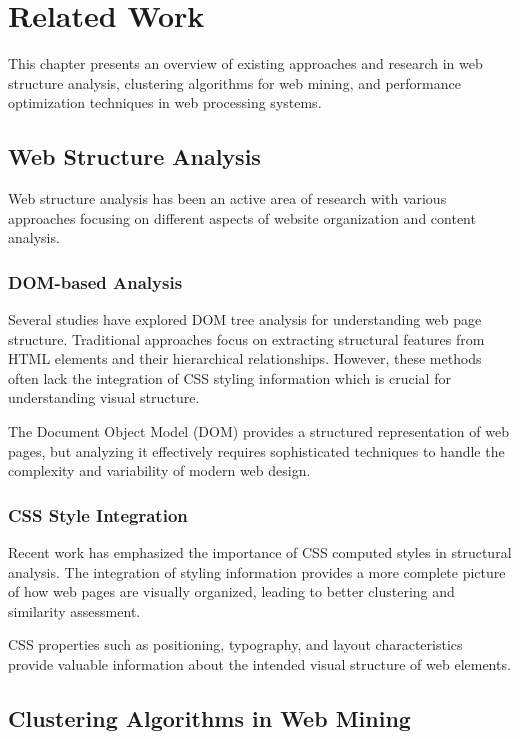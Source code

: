 \chapter{Related Work}
\label{chap:related}

This chapter presents an overview of existing approaches and research in web structure analysis, clustering algorithms for web mining, and performance optimization techniques in web processing systems.

\section{Web Structure Analysis}
\label{sec:web_structure}

Web structure analysis has been an active area of research with various approaches focusing on different aspects of website organization and content analysis.

\subsection{DOM-based Analysis}

Several studies have explored DOM tree analysis for understanding web page structure. Traditional approaches focus on extracting structural features from HTML elements and their hierarchical relationships. However, these methods often lack the integration of CSS styling information which is crucial for understanding visual structure.

The Document Object Model (DOM) provides a structured representation of web pages, but analyzing it effectively requires sophisticated techniques to handle the complexity and variability of modern web design.

\subsection{CSS Style Integration}

Recent work has emphasized the importance of CSS computed styles in structural analysis. The integration of styling information provides a more complete picture of how web pages are visually organized, leading to better clustering and similarity assessment.

CSS properties such as positioning, typography, and layout characteristics provide valuable information about the intended visual structure of web elements.

\section{Clustering Algorithms in Web Mining}
\label{sec:clustering_algorithms}

